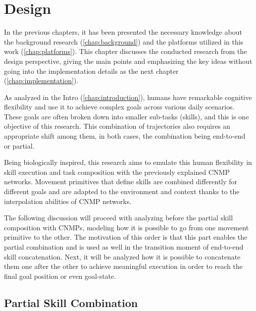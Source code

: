 \chapter{Design} 
\label{chap:design}

In the previous chapters, it has been presented the necessary knowledge about the background research (\cref{chap:background}) and the platforms utilized in this work (\cref{chap:platforms}). 
This chapter discusses the conducted research from the design perspective, giving the main points and emphasizing the key ideas without going into the implementation details as the next chapter (\cref{chap:implementation}). 

As analyzed in the Intro (\cref{chap:introduction}), humans have remarkable cognitive flexibility and use it to achieve complex goals across various daily scenarios. These goals are often broken down into smaller sub-tasks (skills), and this is one objective of this research. This combination of trajectories also requires an appropriate shift among them, in both cases, the combination being end-to-end or partial. 

Being biologically inspired, this research aims to emulate this human flexibility in skill execution and task composition with the previously explained CNMP networks. Movement primitives that define skills are combined differently for different goals and are adapted to the environment and context thanks to the interpolation abilities of CNMP networks.

The following discussion will proceed with analyzing before the partial skill composition with CNMPs, modeling how it is possible to go from one movement primitive to the other. The motivation of this order is that this part enables the partial combination and is used as well in the transition moment of end-to-end skill concatenation. 
Next, it will be analyzed how it is possible to concatenate them one after the other to achieve meaningful execution in order to reach the final goal position or even goal-state.

\newpage
\section{Partial Skill Combination}

